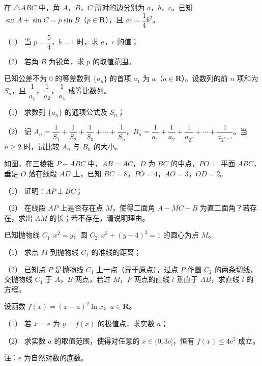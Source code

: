 \begin{question}
在 $\triangle ABC$ 中，角 $A$，$B$，$C$ 所对的边分别为 $a$，$b$，$c$。已知 $\sin A+\sin C=p\sin B$（$p\in\mathbf R$），且 $ac=\dfrac14b^2$。

（1） 当 $p=\dfrac54$，$b=1$ 时，求 $a$，$c$ 的值；

（2） 若角 $B$ 为锐角，求 $p$ 的取值范围。

\end{question}
\begin{question}
已知公差不为 $0$ 的等差数列 $\{a_n\}$ 的首项 $a_1$ 为 $a$（$a\in\mathbf R$）。设数列的前 $n$ 项和为 $S_n$，且 $\dfrac1{a_1}$，$\dfrac1{a_2}$，$\dfrac1{a_4}$ 成等比数列。

（1） 求数列 $\{a_n\}$ 的通项公式及 $S_n$；

（2） 记 $A_n=\dfrac1{S_1}+\dfrac1{S_2}+\dfrac1{S_3}+\cdots+\dfrac1{S_n}$，$B_n=\dfrac1{a_1}+\dfrac1{a_2}+\dfrac1{a_{2^2}}+\cdots+\dfrac1{a_{2^{n-1}}}$。当 $n\geqslant2$ 时，试比较 $A_n$ 与 $B_n$ 的大小。

\Needspace{0.4\textheight}
\end{question}
\begin{question}
如图，在三棱锥 $P-ABC$ 中，$AB=AC$，$D$ 为 $BC$ 的中点，$PO\perp$ 平面 $ABC$，垂足 $O$ 落在线段 $AD$ 上，已知 $BC=8$，$PO=4$，$AO=3$，$OD=2$。

（1） 证明：$AP\perp BC$；

（2） 在线段 $AP$ 上是否存在点 $M$，使得二面角 $A-MC-B$ 为直二面角？若存在，求出 $AM$ 的长；若不存在，请说明理由。
\nopagebreak[4]
\begin{center}\end{center}
\nopagebreak[4]
\Needspace{0.4\textheight}
\end{question}
\begin{question}
已知抛物线 $C_1:x^2=y$，圆 $C_2:x^2+(y-4)^2=1$ 的圆心为点 $M$。

（1） 求点 $M$ 到抛物线 $C_1$ 的准线的距离；

（2） 已知点 $P$ 是抛物线 $C_1$ 上一点（异于原点），过点 $P$ 作圆 $C_2$ 的两条切线，交抛物线 $C_1$ 于 $A$，$B$ 两点，若过 $M$，$P$ 两点的直线 $l$ 垂直于 $AB$，求直线 $l$ 的方程。
\nopagebreak[4]
\begin{center}\end{center}
\nopagebreak[4]
\end{question}
\begin{question}
设函数 $f(x)=(x-a)^2\ln x$，$a\in\mathbf R$。

（1） 若 $x=\mathrm e$ 为 $y=f(x)$ 的极值点，求实数 $a$；

（2） 求实数 $a$ 的取值范围，使得对任意的 $x\in(0,3\mathrm e]$，恒有 $f(x)\leqslant4\mathrm e^2$ 成立。

注：$\mathrm e$ 为自然对数的底数。

\end{question}
